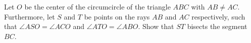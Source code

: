 Let $O$ be the center of the circumcircle of the triangle $ABC$ with $AB\neq AC$.
Furthermore, let $S$ and $T$ be points on the rays $AB$ and $AC$ respectively,
such that $\angle ASO=\angle ACO$ and $\angle ATO= \angle ABO$.
Show that $ST$ bisects the segment $BC$.